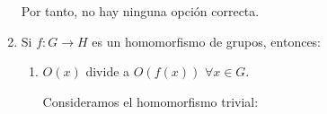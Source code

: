 \documentclass[12pt]{article}
\begin{document}
\begin{ejercicio}
\begin{enumerate}
\begin{enumerate}
\begin{comment}
                        Por tanto, $\{1,x,y,xy\}$ son cuatro elementos distintos de $G$. Como $|G|=8$, elegimos $z\notin \langle x,y\rangle$ y $O(z)=2$. Comprobemos que $xz\notin \{1,x,y,xy,z\}$:
                        \begin{itemize}
                            \item $xz=1\Rightarrow z=x$, contradicción.
                            \item $xz=x\Rightarrow z=1$, contradicción.
                            \item $xz=y\Rightarrow z=y$, contradicción.
                            \item $xz=xy\Rightarrow z=y$, contradicción.
                            \item $xz=z\Rightarrow x=1$, contradicción.
                        \end{itemize}

                        Comprobemos que $zy\notin \{1,x,y,xy,z, xz\}$:
                        \begin{itemize}
                            \item $zy=1\Rightarrow z=y$, contradicción.
                            \item $zy=x\Rightarrow z=xy$, contradicción.
                            \item $zy=y\Rightarrow z=1$, contradicción.
                            \item $zy=xy\Rightarrow z=x$, contradicción.
                            \item $zy=z\Rightarrow y=1$, contradicción.
                        \end{itemize}
                    \end{itemize}


                \end{itemize}
                \end{comment}
            \end{enumerate}

            Por tanto, no hay ninguna opción correcta.
            \item Si $f : G \to H$ es un homomorfismo de grupos, entonces:
            \begin{enumerate}
                \item $O(x)$ divide a $O(f(x))$ $\forall x \in G$.
                
                Consideramos el homomorfismo trivial:


\end{enumerate}
\end{enumerate}
\end{ejercicio}
\end{document}
